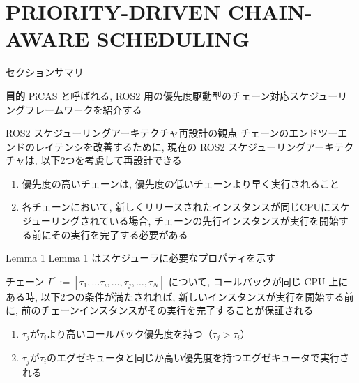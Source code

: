 
\section{PRIORITY-DRIVEN CHAIN-AWARE SCHEDULING}
\label{sec: priority-driven chain-aware scheduling}

\begin{frame}{セクションサマリ}
    \begin{itembox}[l]{\textbf{目的}}
        PiCAS と呼ばれる, ROS2 用の優先度駆動型のチェーン対応スケジューリングフレームワークを紹介する
    \end{itembox}
\end{frame}

\begin{frame}{ROS2 スケジューリングアーキテクチャ再設計の観点}
    チェーンのエンドツーエンドのレイテンシを改善するために, 現在の ROS2 スケジューリングアーキテクチャは, 以下2つを考慮して再設計できる
    \begin{enumerate}
        \item 優先度の高いチェーンは, 優先度の低いチェーンより早く実行されること
        \item 各チェーンにおいて, 新しくリリースされたインスタンスが同じCPUにスケジューリングされている場合, チェーンの先行インスタンスが実行を開始する前にその実行を完了する必要がある
    \end{enumerate}
\end{frame}

\begin{frame}[label=lemma1]{Lemma 1}
    Lemma 1 はスケジューラに必要なプロパティを示す
    \begin{lemma}[]
        チェーン $\Gamma^{c}:=\left[\tau_{1}, \ldots \tau_{i}, \ldots, \tau_{j}, \ldots, \tau_{N}\right]$ について, コールバックが同じ CPU 上にある時, 以下2つの条件が満たされれば, 新しいインスタンスが実行を開始する前に, 前のチェーンインスタンスがその実行を完了することが保証される
        \begin{enumerate}
            \item $\tau_{j}$が$\tau_{i}$より高いコールバック優先度を持つ（$\tau_{j} > \tau_{i}$）
            \item $\tau_{j}$が$\tau_{i}$のエグゼキュータと同じか高い優先度を持つエグゼキュータで実行される
        \end{enumerate}
    \end{lemma}
\end{frame}

